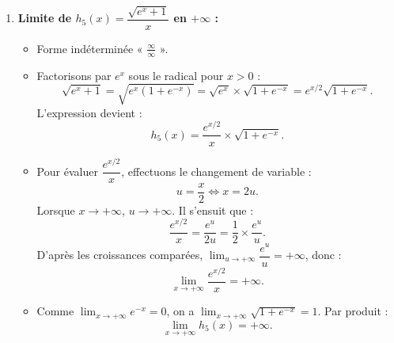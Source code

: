 \documentclass[11pt,a4paper]{article}
\begin{document}
\begin{correctionbox}[Exercice 11]
\begin{enumerate}[label=\textbf{\arabic*.}]
    \item \textbf{Limite de $h_5(x) = \dfrac{\sqrt{e^x + 1}}{x}$ en $+\infty$ :}
    \begin{itemize}
        \item Forme indéterminée « $\frac{\infty}{\infty}$ ».
        \item Factorisons par $e^x$ sous le radical pour $x > 0$ :
        \[
        \sqrt{e^x + 1} = \sqrt{e^x \left(1 + e^{-x}\right)} = \sqrt{e^x} \times \sqrt{1 + e^{-x}} = e^{x/2} \sqrt{1 + e^{-x}}.
        \]
        L'expression devient :
        \[
        h_5(x) = \frac{e^{x/2}}{x} \times \sqrt{1 + e^{-x}}.
        \]
        \item Pour évaluer $\dfrac{e^{x/2}}{x}$, effectuons le changement de variable :
        \[
        u = \frac{x}{2} \iff x = 2u.
        \]
        Lorsque $x \to +\infty$, $u \to +\infty$. Il s'ensuit que :
        \[
        \frac{e^{x/2}}{x} = \frac{e^u}{2u} = \frac{1}{2} \times \frac{e^u}{u}.
        \]
        D'après les croissances comparées, $\lim_{u \to +\infty} \dfrac{e^u}{u} = +\infty$, donc :
        \[
        \lim_{x \to +\infty} \frac{e^{x/2}}{x} = +\infty.
        \]
        \item Comme $\lim_{x \to +\infty} e^{-x} = 0$, on a $\lim_{x \to +\infty} \sqrt{1 + e^{-x}} = 1$.
        Par produit :
        \[
        \boxed{\lim_{x \to +\infty} h_5(x) = +\infty}.
        \]
    \end{itemize}


\end{enumerate}
\end{correctionbox}
\end{document}
